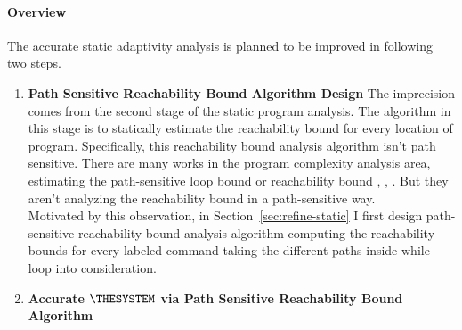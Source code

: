 \paragraph*{Overview}
The accurate static adaptivity analysis is planned to be improved in following two steps.
\begin{enumerate}
    \item \textbf{Path Sensitive Reachability Bound Algorithm Design}
    The imprecision comes from the second stage of the static program analysis.
    The algorithm in this stage is to statically estimate the 
    reachability bound for every location of program.
    Specifically, this reachability bound analysis algorithm isn't path sensitive. 
    There are many works in the program complexity analysis area, estimating the path-sensitive loop bound 
    or reachability bound
    \cite{GustafssonEL05, HumenbergerJK18}, 
    \cite{BrockschmidtEFFG16,AlbertAGP08,AliasDFG10,Flores-MontoyaH14}, 
    \cite{GulwaniZ10, SinnZV17,GulwaniJK09, GulwaniMC09, abs-2203-04243}. 
    But they aren't analyzing the reachability
    bound in a path-sensitive way.
    \\
    Motivated by this observation, 
    in Section~\ref{sec:refine-static} 
    I first design path-sensitive reachability bound analysis algorithm computing the 
    reachability bounds for every labeled command taking the different paths inside while loop into consideration.
    \item \textbf{Accurate $\THESYSTEM$ via Path Sensitive Reachability Bound Algorithm}


\end{enumerate}

